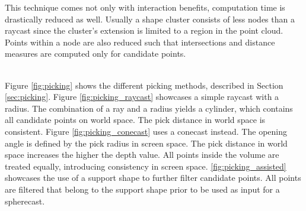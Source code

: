 This technique comes not only with interaction benefits, computation time is drastically reduced as well. Usually a shape cluster consists of less nodes than a raycast since the cluster's extension is limited to a region in the point cloud. Points within a node are also reduced such that intersections and distance measures are computed only for candidate points. 

\\
Figure \ref{fig:picking} shows the different picking methods, described in Section \ref{sec:picking}. Figure \ref{fig:picking_raycast} showcases a simple raycast with a radius. The combination of a ray and a radius yields a cylinder, which contains all candidate points on world space. The pick distance in world space is consistent. Figure \ref{fig:picking_conecast} uses a conecast instead. The opening angle is defined by the pick radius in screen space. The pick distance in world space increases the higher the depth value. All points inside the volume are treated equally, introducing consistency in screen space. \Figure\ref {fig:picking_assisted} showcases the use of a support shape to further filter candidate points. All points are filtered that belong to the support shape prior to be used as input for a spherecast. 


